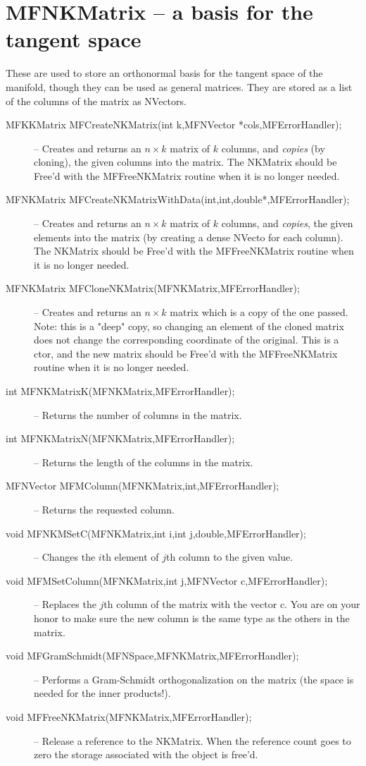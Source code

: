 \documentclass[12pt]{article}
\begin{document}
\section{MFNKMatrix -- a basis for the tangent space}
These are used to store an orthonormal basis for the tangent space of the
manifold, though they can be used as general matrices. They are stored 
as a list of the columns of the matrix as NVectors.
\begin{description}
\item [MFKKMatrix MFCreateNKMatrix(int k,MFNVector *cols,MFErrorHandler);]
-- Creates and returns an $n\times k$ matrix of $k$ columns, and 
{\it copies} (by cloning), the given columns into the matrix.
The NKMatrix should be Free'd with the MFFreeNKMatrix routine when it is no longer needed.
\item [MFNKMatrix MFCreateNKMatrixWithData(int,int,double*,MFErrorHandler);]
-- Creates and returns an $n\times k$ matrix of $k$ columns, and 
{\it copies}, the given elements into the matrix (by creating a dense NVecto
for each column).
The NKMatrix should be Free'd with the MFFreeNKMatrix routine when it is no longer needed.
\item [MFNKMatrix MFCloneNKMatrix(MFNKMatrix,MFErrorHandler);]
-- Creates and returns an $n\times k$ matrix which is a copy of the one passed.
Note: this is a "deep" copy, so changing an element of the cloned matrix
does not change the corresponding coordinate of the original.
This is a ctor, and the new matrix should be Free'd with the MFFreeNKMatrix routine when it is no longer needed.
\item [int MFNKMatrixK(MFNKMatrix,MFErrorHandler);]
-- Returns the number of columns in the matrix.
\item [int MFNKMatrixN(MFNKMatrix,MFErrorHandler);]
-- Returns the length of the columns in the matrix.
\item [MFNVector MFMColumn(MFNKMatrix,int,MFErrorHandler);]
-- Returns the requested column.
\item [void MFNKMSetC(MFNKMatrix,int i,int j,double,MFErrorHandler);]
-- Changes the $i$th element of $j$th column to the given value.
\item [void MFMSetColumn(MFNKMatrix,int j,MFNVector c,MFErrorHandler);]
-- Replaces the $j$th column of the matrix with the vector {c}. You are
on your honor to make sure the new column is the same type as the others in 
the matrix.
\item [void MFGramSchmidt(MFNSpace,MFNKMatrix,MFErrorHandler);]
-- Performs a Gram-Schmidt orthogonalization on the matrix (the space is 
needed for the inner products!).
\item [void MFFreeNKMatrix(MFNKMatrix,MFErrorHandler);]
-- Release a reference to the NKMatrix. When the reference count goes to zero the
   storage associated with the object is free'd.
\end{description}
\end{document}
